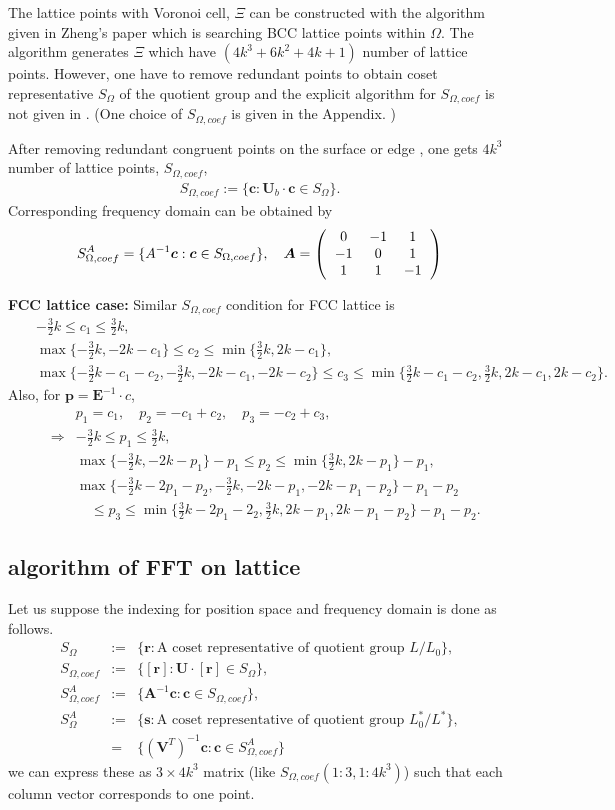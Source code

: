 \documentclass[10pt]{book}
\def\bm{\boldsymbol}
\newcommand{\bea}{\begin{eqnarray}}
\newcommand{\eea}{\end{eqnarray}}
\newcommand{\no}{\nonumber \\}
\def\vp{{\bm p}}
\newcommand{\threedmat}[9]
{\left(\begin{tabular}{ccc} {$#1$}&{$#2$}&{$#3$} \\
		{$#4$}&{$#5$}&{$#6$}\\
		{$#7$}&{$#8$}&{$#9$}\\
	    \end{tabular}\right)}
\begin{document}
The lattice points with Voronoi cell, $\Xi$
can be constructed with the algorithm given in 
Zheng's paper\cite{Zheng} which is searching BCC lattice points within $\Omega$.
The algorithm generates $\Xi$ which have 
$(4k^3+6k^2+4k+1)$ number of lattice points. 
However, one have to remove redundant points to obtain coset representative $S_{\Omega}$ 
of the quotient group and the explicit algorithm for  $S_{\Omega,coef}$ is not given in \cite{Zheng}. (One choice of  $S_{\Omega,coef}$ is given in the Appendix. )

After removing redundant congruent points on the surface or edge
 , one gets $4k^3$ number of lattice points, $S_{\Omega,coef}$,
\bea 
S_{\Omega,coef}:=\{ {\bm c}: {\bm U}_b\cdot{\bm c}\in S_\Omega \}.
\eea  
Corresponding frequency domain can be obtained by 
\bea 
S^A_{\Omega,coef}=\{A^{-1}{\bm c}:{\bm c}\in S_{\Omega,coef} \},\quad 
{\bm A}=\threedmat{0}{-1}{1}{-1}{0}{1}{1}{1}{-1}
\eea 

{\bf FCC lattice case:} Similar $S_{\Omega,coef}$ condition for FCC lattice is 
\bea 
& & -\frac{3}{2}k\leq c_1\leq \frac{3}{2}k, \no 
& & \max\{-\frac{3}{2}k,-2k-c_1\}\leq c_2 \leq \min\{\frac{3}{2}k,2k-c_1\},\no 
& & \max\{-\frac{3}{2}k-c_1-c_2,-\frac{3}{2}k,-2k-c_1,-2k-c_2\}\leq c_3
    \leq \min\{\frac{3}{2}k-c_1-c_2,\frac{3}{2}k,2k-c_1,2k-c_2\}.  \nonumber 
\eea 
Also, for $\vp={\bm E}^{-1}\cdot c$,
\bea 
& &p_1=c_1,\quad p_2=-c_1+c_2,\quad p_3=-c_2+c_3,\no 
&\Rightarrow & -\frac{3}{2}k\leq p_1\leq \frac{3}{2}k, \no 
& & \max\{-\frac{3}{2}k,-2k-p_1\}-p_1\leq p_2 \leq \min\{\frac{3}{2}k,2k-p_1\}-p_1,\no 
& & \max\{-\frac{3}{2}k-2p_1-p_2,-\frac{3}{2}k,-2k-p_1,-2k-p_1-p_2\}-p_1-p_2 \no
 & &\quad \leq p_3 \leq \min\{\frac{3}{2}k-2p_1-2_2,\frac{3}{2}k,2k-p_1,2k-p_1-p_2\}-p_1-p_2. 
\eea 

\subsection{algorithm of FFT on lattice}
Let us suppose the indexing for position space and frequency domain is done as follows.
\bea 
S_{\Omega} &:=&\{{\bm r}: \mbox{A coset representative of quotient group } L/L_0 \},\no 
S_{\Omega,coef}&:=&\{ [{\bm r}] : {\bm U}\cdot[{\bm r}] \in S_{\Omega} \},\no 
S^A_{\Omega,coef}&:=&\{{\bm A}^{-1}{\bm c}: {\bm c}\in S_{\Omega,coef}\},\no 
S^A_{\Omega}&:=&\{{\bm s}: \mbox{A coset representative of quotient group } L_0^*/L^*  \},\no
&=&\{({\bm V}^T)^{-1}{\bm c} :{\bm c}\in  S^A_{\Omega,coef}    \}
\eea 
we can express these as $3\times 4k^3$ matrix (like $S_{\Omega,coef}(1:3,1:4k^3)$)
such that each column vector corresponds to one point. 
\end{document}

